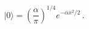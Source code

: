 \begin{equation}
| 0 \rangle = \left( \frac{\alpha}{ \pi}  \right)^{1/4} e^{-\alpha x^2/2}\,.
\end{equation}

